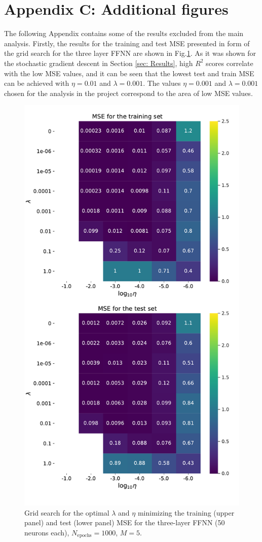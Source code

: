 \documentclass{emulateapj}
\begin{document}
\section{Appendix C: Additional figures}
\label{Appendix:C}

The following Appendix contains some of the results excluded from the main analysis. Firstly, the results for the training and test MSE presented in form of the grid search for the three layer FFNN are shown in Fig.\ref{fig: NN_Ridge_MSE}. As it was shown for the stochastic gradient descent in Section \ref{sec: Results}, high $R^2$ scores correlate with the low MSE values, and it can be seen that the lowest test and train MSE can be achieved with $\eta=0.01$ and $\lambda=0.001$. The values $\eta=0.001$ and $\lambda=0.001$ chosen for the analysis in the project correspond to the area of low MSE values.

\begin{figure}[!ht]
    \centering
    \includegraphics[width=.49\textwidth]{Figures/NN_Ridge_MSE.pdf}
    \caption{Grid search for the optimal $\lambda$ and $\eta$ minimizing the training (upper panel) and test (lower panel) MSE for the three-layer FFNN (50 neurons each), $N_{\mathrm{epochs}}=1000$, $M=5$.}
    \label{fig: NN_Ridge_MSE}
\end{figure}
\end{document}

